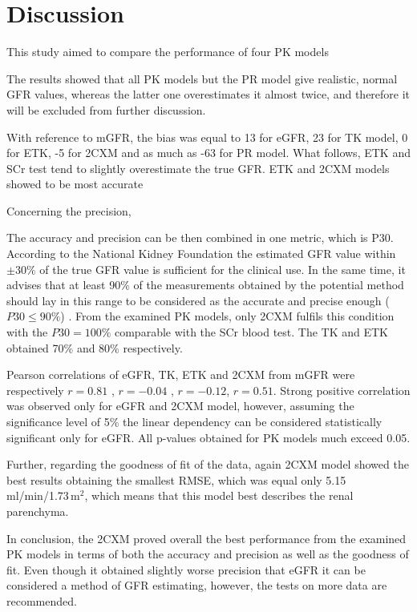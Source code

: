 \chapter{Discussion}
This study aimed to compare the performance of four PK models  

The results showed that all PK models but the PR model give realistic, normal GFR values, whereas the latter one overestimates it almost twice, and therefore it will be excluded from further discussion. 

With reference to mGFR, the bias was equal to 13 for eGFR, 23 for TK model, 0 for ETK, -5 for 2CXM and as much as -63 for PR model. What follows, ETK and SCr test tend to slightly overestimate the true GFR. 
ETK and 2CXM models showed to be most accurate

Concerning the precision,    

The accuracy and precision can be then combined in one metric, which is P30.  
According to the National Kidney Foundation the estimated GFR value within $\pm30\%$ of the true GFR value is sufficient for the clinical use. In the same time, it advises that at least 90\% of the measurements obtained by the potential method should lay in this range to be considered as the accurate and precise enough ($P30\leqslant90\%$) \cite{levey2003national}. From the examined PK models, only 2CXM fulfils this condition with the $P30=100\%$ comparable with  the SCr blood test. The TK and ETK obtained 70\% and 80\% respectively.   

Pearson correlations of eGFR, TK, ETK and 2CXM from mGFR were respectively $r=0.81$ , $r=-0.04$ , $r=-0.12$, $r=0.51$. Strong positive correlation was observed only for eGFR and 2CXM model, however, assuming the significance level of 5\% the linear dependency can be considered statistically significant only for eGFR. All p-values obtained for PK models much exceed 0.05.  

Further, regarding the goodness of fit of the data, again 2CXM model showed the best results obtaining the smallest RMSE, which was equal only 5.15 ml/min/1.73\,m$^2$, which means that this model best describes the renal parenchyma.  

In conclusion, the 2CXM proved overall the best performance from the examined PK models in terms of both the accuracy and precision as well as the goodness of fit. Even though it obtained slightly worse precision that eGFR it can be considered a method of GFR estimating, however, the tests on more data are recommended.      





